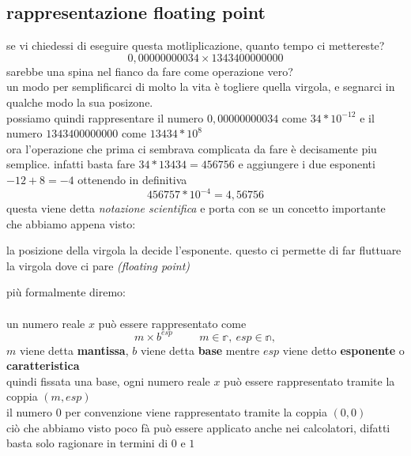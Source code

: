\documentclass{article}
\begin{document}
\subsection{rappresentazione floating point}
se vi chiedessi di eseguire questa motliplicazione, quanto tempo ci mettereste?
\begin{equation}
  0,00000000034 \times 
  1343400000000
  \label{eq:motliplicazione base 10 senza notazione scientifica}
\end{equation}
sarebbe una spina nel fianco da fare come operazione vero? \\ 
un modo per semplificarci di molto la vita è togliere quella virgola, e segnarci in qualche modo la sua posizone.\\ 
possiamo quindi rappresentare il numero $0,00000000034$ come $34 * 10^{-12}$ e il numero $1343400000000$ come $13434 * 10^{8}$ \\
ora l'operazione che prima ci sembrava complicata da fare è decisamente piu semplice. infatti basta fare $34 * 13434 = 456756$ e aggiungere i due esponenti $-12 + 8 = -4$  ottenendo in definitiva $$
456757 * 10^{-4} = 4,56756 
$$
questa viene detta \textit{notazione scientifica} e porta con se un concetto importante che abbiamo appena visto:\\
\begin{proposition}
la posizione della virgola la decide l'esponente. questo ci permette di far fluttuare la virgola dove ci pare \textit{(floating point)}
\end{proposition}
più formalmente diremo: \\ \\
un numero reale $x$ può essere rappresentato come
\begin{equation}
  m \times b^{esp} \hspace{1cm} m \in \mathbb{r}, \ esp \in \mathbb{n}, 
\end{equation}
$m$ viene detta \textbf{mantissa}, $b$ viene detta \textbf{base} mentre $esp$ viene detto \textbf{esponente} o \textbf{caratteristica} \\
quindi fissata una base, ogni numero reale $x$ può essere rappresentato tramite la coppia $(m,esp)$ \\
il  numero $0$ per convenzione viene rappresentato tramite la coppia $(0,0)$ \\
ciò che abbiamo visto poco fà può essere applicato anche nei calcolatori, difatti basta solo ragionare in termini di $0$ e $1$\\ \\
\end{document}
